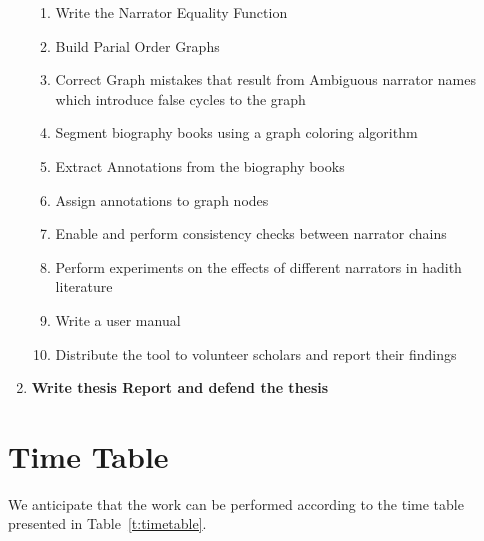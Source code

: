 \documentclass[a4,12pt]{report}
\begin{document}
\begin{enumerate}
\begin{enumerate}
	\item Write the Narrator Equality Function
	\item Build Parial Order Graphs
	\item Correct Graph mistakes that result from Ambiguous narrator names which introduce false cycles to the graph
	\item Segment biography books using a graph coloring algorithm
	\item Extract Annotations from the biography books
	\item Assign annotations to graph nodes
	\item Enable and perform consistency checks between narrator chains
	\item Perform experiments on the effects of different narrators in hadith literature
	\item Write a user manual
	\item Distribute the tool to volunteer scholars and report their findings
	\end{enumerate}
\item \textbf{Write thesis Report and defend the thesis}
\end{enumerate}

\section{Time Table}

We anticipate that the work can be performed according to the time table presented in
Table~\ref{t:timetable}. \\

~\\
\end{document}
